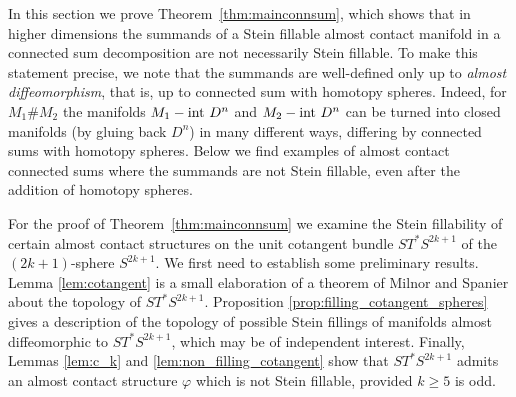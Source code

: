 \documentclass[12pt]{amsart}
\newtheorem{Theorem}{Theorem}[section]
\theoremstyle{remark}
\begin{document}
In this section we prove Theorem~\ref{thm:mainconnsum}, which shows 
that in higher dimensions the summands of a Stein fillable almost
contact manifold in a connected sum decomposition are not necessarily
Stein fillable.  To make this statement precise, we note that the summands are
well-defined only up to \emph{almost diffeomorphism}, that is, up to
connected sum with homotopy spheres.  Indeed, for $M_1\# M_2$ the
manifolds $M_1-{\rm {int}}\ D^n$ and $M_2- {\rm {int}}\ D^n$ can be
turned into closed manifolds (by gluing back $D^n$) in many different
ways, differing by connected sums with homotopy spheres.  Below we 
find examples  of almost contact connected sums
where the summands are not Stein fillable, even after the addition
of homotopy spheres.

\begin{comment}
With this
caveat in mind, we have the following theorem, showing that
Eliashberg's result does not generalize to higher dimensions in a
naive way.

\begin{Theorem} \label{thm:8k{+}1_connected_sum}
For every even number $q \geq 4$ there is a closed almost contact
$(2q{+}1)$-manifold $(M,\varphi)$ such that $-(M,\varphi) \# (M,\varphi)$ admits a Stein fillable
almost contact structure, but for every homotopy $(2q{+}1)$-sphere
$\Sigma$, neither $(M \# \Sigma, \varphi \# \varphi
  _{\Sigma})$ nor $(-M   \#  \Sigma, -\varphi \# \varphi
  _{\Sigma})$ is Stein
fillable.

\end{Theorem}
%
\end{comment}

For the proof of Theorem~\ref{thm:mainconnsum} we examine the Stein
fillability of certain almost contact structures on the unit cotangent
bundle $ST^*S^{2k{+}1}$ of the $(2k{+}1)$-sphere  $S^{2k{+}1}$.  We first need to
establish some preliminary results.  Lemma \ref{lem:cotangent} is a
small elaboration of a theorem of Milnor and Spanier about the
topology of $ST^*S^{2k{+}1}$.
Proposition \ref{prop:filling_cotangent_spheres} gives a 
description of the topology of possible Stein fillings of manifolds almost
diffeomorphic to $ST^*S^{2k{+}1}$, which may be of independent interest. 
Finally, Lemmas \ref{lem:c_k} and \ref{lem:non_filling_cotangent} show that $ST^*S^{2k{+}1}$
admits an almost contact structure $\varphi$ which is not Stein fillable,
provided $k \geq 5$ is odd.
\end{document}
